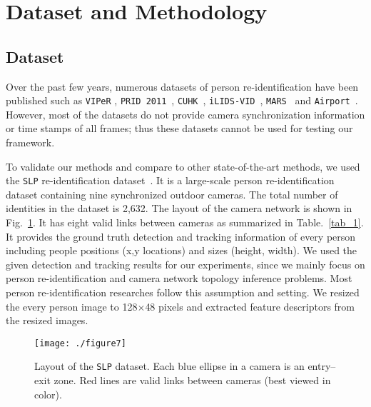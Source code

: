 \documentclass[10pt,twocolumn,letterpaper]{article}
\begin{document}
	
	\section{Dataset and Methodology}
	\label{sec:data_meth}
	
	\subsection{Dataset}
	
	Over the past few years, numerous datasets of person re-identification have been published such as \texttt{VIPeR} \cite{gray2007evaluating}, \texttt{PRID 2011}~\cite{hirzer11a}, \texttt{CUHK}~\cite{li2013locally,li2014deepreid}, \texttt{iLIDS-VID}~\cite{wang2014person}, \texttt{MARS}~\cite{zheng2016mars} and \texttt{Airport}~\cite{Karanam2016peid_review}. 
	However, most of the datasets do not provide camera synchronization information or time stamps of all frames; thus these datasets cannot be used for testing our framework.
	
	To validate our methods and compare to other state-of-the-art methods, we used the \texttt{SLP} re-identification dataset~\cite{Cho_2017_ICCV_Workshops}. It is a large-scale person re-identification dataset containing nine synchronized outdoor cameras. The total number of identities in the dataset is 2,632. The layout of the camera network is shown in Fig.~\ref{fig_7}. It has eight valid links between cameras as summarized in Table.~\ref{tab_1}.
	It provides the ground truth detection and tracking information of every person including people positions (x,y locations) and sizes (height, width).
	We used the given detection and tracking results for our experiments, since we mainly focus on person re-identification and camera network topology inference problems.
	Most person re-identification researches follow this assumption and setting.
	We resized the every person image to 128$\times$48 pixels and extracted feature descriptors from the resized images.
	
	
	
	\begin{figure}[t]	
		\centering
		\texttt{[image: ./figure7]}
		\caption{Layout of the \texttt{SLP} dataset. Each blue ellipse in a camera is an entry--exit zone. Red lines are valid links between cameras (best viewed in color).}
		\label{fig_7}
	\end{figure}
	
\end{document}
